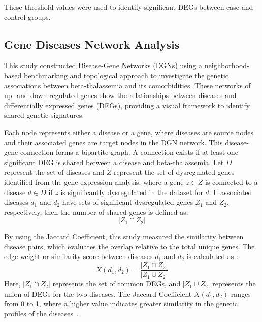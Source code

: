 These threshold values were used to identify significant DEGs between case and control groups.

\vspace*{-\parskip} %
\subsection{Gene Diseases Network Analysis}
\label{sec:sec3_4_3}

This study constructed Disease-Gene Networks (DGNs) using a neighborhood-based benchmarking and topological approach to investigate the genetic associations between beta-thalassemia and its comorbidities. These networks of up- and down-regulated genes show the relationships between diseases and differentially expressed genes (DEGs), providing a visual framework to identify shared genetic signatures.

Each node represents either a disease or a gene, where diseases are source nodes and their associated genes are target nodes in the DGN network. This disease-gene connection forms a bipartite graph. A connection exists if at least one significant DEG is shared between a disease and beta-thalassemia. Let \(D\) represent the set of diseases and \(Z\) represent the set of dysregulated genes identified from the gene expression analysis, where a gene \(z \in Z\) is connected to a disease \(d \in D\) if \(z\) is significantly dysregulated in the dataset for \(d\). If associated diseases \(d_1\) and \(d_2\) have sets of significant dysregulated genes \(Z_1\) and \(Z_2\), respectively, then the number of shared genes is defined as:
\begin{equation}
|Z_1 \cap Z_2|
\label{eq:shared_genes}
\end{equation}

By using the Jaccard Coefficient, this study measured the similarity between disease pairs, which evaluates the overlap relative to the total unique genes. The edge weight or similarity score between diseases \(d_1\) and \(d_2\) is calculated as \cite{b16}:
\begin{equation}
X(d_1, d_2) = \frac{|Z_1 \cap Z_2|}{|Z_1 \cup Z_2|}
\label{eq:jaccard}
\end{equation}
Here, \(|Z_1 \cap Z_2|\) represents the set of common DEGs, and \(|Z_1 \cup Z_2|\) represents the union of DEGs for the two diseases. The Jaccard Coefficient \(X(d_1, d_2)\) ranges from 0 to 1, where a higher value indicates greater similarity in the genetic profiles of the diseases~\cite{b20}.

